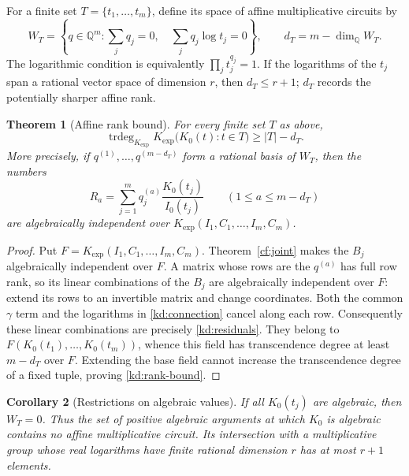 \documentclass[11pt]{article}
\newtheorem{theorem}{Theorem}[section]
\newtheorem{corollary}[theorem]{Corollary}
\theoremstyle{definition}
\theoremstyle{remark}
\begin{document}
For a finite set $T=\{t_1,\ldots,t_m\}$, define its space of affine
multiplicative circuits by
\[
 W_T=\left\{q\in\mathbb Q^m:
       \sum_jq_j=0,\quad\sum_jq_j\log t_j=0\right\},
 \qquad d_T=m-\dim_{\mathbb Q}W_T.
\]
The logarithmic condition is equivalently $\prod_j t_j^{q_j}=1$.
If the logarithms of the $t_j$ span a rational vector space of dimension
$r$, then $d_T\leq r+1$; $d_T$ records the potentially sharper affine
rank.

\begin{theorem}[Affine rank bound]\label{kd:rank}
For every finite set $T$ as above,
\begin{equation}\label{kd:rank-bound}
 \operatorname{trdeg}_{K_{\exp}}
 K_{\exp}\bigl(K_0(t):t\in T\bigr)\geq |T|-d_T.
\end{equation}
More precisely, if $q^{(1)},\ldots,q^{(m-d_T)}$ form a rational basis of
$W_T$, then the numbers
\begin{equation}\label{kd:residuals}
 R_a=\sum_{j=1}^m q_j^{(a)}\frac{K_0(t_j)}{I_0(t_j)}
 \qquad(1\leq a\leq m-d_T)
\end{equation}
are algebraically independent over
$K_{\exp}(I_1,C_1,\ldots,I_m,C_m)$.
\end{theorem}

\begin{proof}
Put $F=K_{\exp}(I_1,C_1,\ldots,I_m,C_m)$.  Theorem~\ref{cf:joint} makes the
$B_j$ algebraically independent over $F$.  A matrix whose rows are the
$q^{(a)}$ has full row rank, so its linear combinations of the $B_j$
are algebraically independent over $F$: extend its rows to an invertible
matrix and change coordinates.  Both the common $\gamma$ term and the
logarithms in \eqref{kd:connection} cancel along each row.  Consequently
these linear combinations are precisely \eqref{kd:residuals}.
They belong to $F(K_0(t_1),\ldots,K_0(t_m))$, whence this field has
transcendence degree at least $m-d_T$ over $F$.  Extending the base field
cannot increase the transcendence degree of a fixed tuple, proving
\eqref{kd:rank-bound}.
\end{proof}

\begin{corollary}[Restrictions on algebraic values]\label{kd:exceptions}
If all $K_0(t_j)$ are algebraic, then $W_T=0$.  Thus the set of positive
algebraic arguments at which $K_0$ is algebraic contains no affine
multiplicative circuit.  Its intersection with a multiplicative group
whose real logarithms have finite rational dimension $r$ has at most
$r+1$ elements.
\end{corollary}
\end{document}
